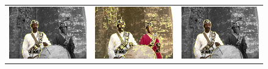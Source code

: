 \documentclass[smallextended]{svjour3}       %
\begin{document}
{{\begin{figure}[ht!]
\begin{tabular}{ccc}
		\includegraphics[scale=0.2]{images/segmentation/bc/man/gc-seg.png} &
		\includegraphics[scale=0.2]{images/segmentation/schoenemann/man/man-seg.png} &
		\includegraphics[scale=0.2]{images/segmentation/bc/man/corrected-seg.png}\\		

\end{tabular}
\end{figure}}}
\end{document}

